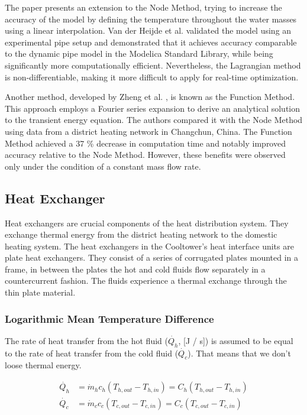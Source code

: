 The paper \cite{OPPELT2016336} presents an extension to the Node Method, trying to increase the accuracy of the model by defining the temperature throughout the water masses using a linear interpolation. Van der Heijde et al. \cite{VANDERHEIJDE2017158} validated the model using an experimental pipe setup and demonstrated that it achieves accuracy comparable to the dynamic pipe model in the Modelica Standard Library, while being significantly more computationally efficient. Nevertheless, the Lagrangian method is non-differentiable, making it more difficult to apply for real-time optimization. 

Another method, developed by Zheng et al. \cite{ZHENG2017682}, is known as the Function Method. This approach employs a Fourier series expansion to derive an analytical solution to the transient energy equation. The authors compared it with the Node Method using data from a district heating network in Changchun, China. The Function Method achieved a 37 \% decrease in computation time and notably improved accuracy relative to the Node Method. However, these benefits were observed only under the condition of a constant mass flow rate. 

\subsection{Heat Exchanger}
Heat exchangers are crucial components of the heat distribution system. They exchange thermal energy from the district heating network to the domestic heating system. The heat exchangers in the Cooltower's heat interface units are plate heat exchangers. They consist of a series of corrugated plates mounted in a frame, in between the plates the hot and cold fluids flow separately in a countercurrent fashion. The fluids experience a thermal exchange through the thin plate material.  

\subsubsection{Logarithmic Mean Temperature Difference}

The rate of heat transfer from the hot fluid ($\dot{Q_{h}}$, [J / s]) is assumed to be equal to the rate of heat transfer from the cold fluid ($\dot{Q_{c}}$). That means that we don't loose thermal energy. 

\begin{align}
    \dot{Q_h} &= \dot{m}_hc_h(T_{h,out} - T_{h,in}) = C_h (T_{h,out} - T_{h,in}) \\  
    \dot{Q_c} &= \dot{m}_cc_c(T_{c,out} - T_{c,in}) = C_c (T_{c,out} - T_{c,in})
\end{align}

